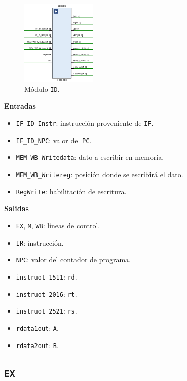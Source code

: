 \documentclass[a4paper]{article}
\begin{document}
\begin{figure}[H]
	\begin{center}				
	\includegraphics[width=0.32\textwidth]{TP4_3.png}
  	\caption{Módulo \texttt{ID}.}
  	\label{fig:funcionamiento.}
  	\end{center}
\end{figure}

\textbf{Entradas}
\begin{itemize}
	\item \texttt{IF\_ID\_Instr}: instrucción proveniente de \texttt{IF}.
	\item \texttt{IF\_ID\_NPC}: valor del \texttt{PC}.
	\item \texttt{MEM\_WB\_Writedata}: dato a escribir en memoria.
	\item \texttt{MEM\_WB\_Writereg}: posición donde se escribirá el dato.
	\item \texttt{RegWrite}: habilitación de escritura.
\end{itemize}

\textbf{Salidas}
\begin{itemize}
	\item \texttt{EX}, \texttt{M}, \texttt{WB}: líneas de control.
	\item \texttt{IR}: instrucción.
	\item \texttt{NPC}: valor del contador de programa.
	\item \texttt{instruot\_1511}: \texttt{rd}.
	\item \texttt{instruot\_2016}: \texttt{rt}.
	\item \texttt{instruot\_2521}: \texttt{rs}.
	\item \texttt{rdata1out}: \texttt{A}.
	\item \texttt{rdata2out}: \texttt{B}.
\end{itemize}

\subsection{\texttt{EX}}
\end{document}
